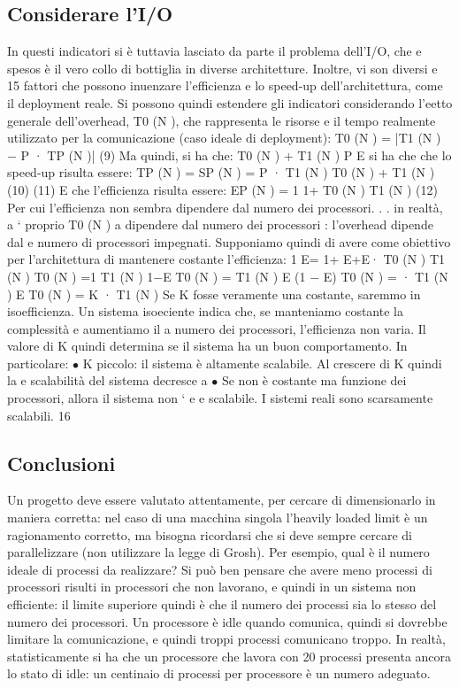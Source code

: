 \documentclass[a4paper,12pt]{article}
\begin{document}
\subsection{Considerare l'I/O}
In questi indicatori si è tuttavia lasciato da parte il problema dell'I/O, che
e
spesos è il vero collo di bottiglia in diverse architetture. Inoltre, vi son diversi
e
15
fattori che possono inuenzare l'efficienza e lo speed-up dell'architettura, come
il deployment reale. Si possono quindi estendere gli indicatori considerando
l'eetto generale dell'overhead, T0 (N ), che rappresenta le risorse e il tempo
realmente utilizzato per la comunicazione (caso ideale di deployment):
T0 (N ) = |T1 (N ) $-$ P · TP (N )|
(9)
Ma quindi, si ha che:
T0 (N ) + T1 (N )
P
E si ha che che lo speed-up risulta essere:
TP (N ) =
SP (N ) =
P · T1 (N )
T0 (N ) + T1 (N )
(10)
(11)
E che l'efficienza risulta essere:
EP (N ) =
1
1+
T0 (N )
T1 (N )
(12)
Per cui l'efficienza non sembra dipendere dal numero dei processori. . . in realtà,
a
` proprio T0 (N ) a dipendere dal numero dei processori : l'overhead dipende dal
e
numero di processori impegnati.
Supponiamo quindi di avere come obiettivo per l'architettura di mantenere
costante l'efficienza:
1
E=
1+
E+E·
T0 (N )
T1 (N )
T0 (N )
=1
T1 (N )
1$-$E
T0 (N )
=
T1 (N )
E
(1 $-$ E)
T0 (N ) =
· T1 (N )
E
T0 (N ) = K · T1 (N )
Se K fosse veramente una costante, saremmo in isoefficienza. Un sistema isoeciente indica che, se manteniamo costante la
complessità e aumentiamo il
a
numero dei processori, l'efficienza non varia. Il valore di K quindi determina se
il sistema ha un buon comportamento. In particolare:
$\bullet$ K piccolo: il sistema è altamente scalabile. Al crescere di K quindi la
e
scalabilità del sistema decresce
a
$\bullet$ Se non è costante ma funzione dei processori, allora il sistema non `
e
e
scalabile.
I sistemi reali sono scarsamente scalabili.
16
\subsection{Conclusioni}
Un progetto deve essere valutato attentamente, per cercare di dimensionarlo in maniera corretta: nel caso di una
macchina singola l'heavily loaded limit è un ragionamento corretto, ma bisogna ricordarsi che si deve sempre cercare di
parallelizzare (non utilizzare la legge di Grosh). Per esempio, qual è il numero ideale di processi da realizzare? Si
può ben pensare che avere meno processi di processori risulti in processori che non lavorano, e quindi in un sistema 
non efficiente: il limite superiore quindi è che il numero dei processi sia lo stesso del numero dei processori. Un
processore è idle quando comunica, quindi si dovrebbe limitare la comunicazione, e quindi troppi processi comunicano
troppo.
In realtà, statisticamente si ha che un processore che lavora con 20 processi presenta ancora lo stato di idle: un
centinaio di processi per processore è un numero adeguato.
\end{document}
